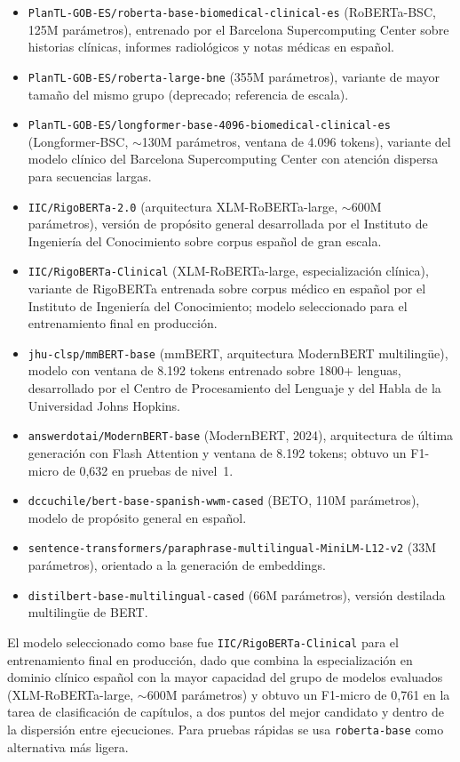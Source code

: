 \begin{itemize}
 \item \texttt{PlanTL-GOB-ES/roberta-base-biomedical-clinical-es} (RoBERTa-BSC, 125M parámetros), entrenado por el Barcelona Supercomputing Center sobre historias clínicas, informes radiológicos y notas médicas en español.
 \item \texttt{PlanTL-GOB-ES/roberta-large-bne} (355M parámetros), variante de mayor tamaño del mismo grupo (deprecado; referencia de escala).
 \item \texttt{PlanTL-GOB-ES/longformer-base-4096-biomedical-clinical-es} (Longformer-BSC, $\sim$130M parámetros, ventana de 4.096 tokens), variante del modelo clínico del Barcelona Supercomputing Center con atención dispersa para secuencias largas.
 \item \texttt{IIC/RigoBERTa-2.0} (arquitectura XLM-RoBERTa-large, $\sim$600M parámetros), versión de propósito general desarrollada por el Instituto de Ingeniería del Conocimiento sobre corpus español de gran escala.
 \item \texttt{IIC/RigoBERTa-Clinical} (XLM-RoBERTa-large, especialización clínica), variante de RigoBERTa entrenada sobre corpus médico en español por el Instituto de Ingeniería del Conocimiento; modelo seleccionado para el entrenamiento final en producción.
 \item \texttt{jhu-clsp/mmBERT-base} (mmBERT, arquitectura ModernBERT multilingüe), modelo con ventana de 8.192 tokens entrenado sobre 1800+ lenguas, desarrollado por el Centro de Procesamiento del Lenguaje y del Habla de la Universidad Johns Hopkins.
 \item \texttt{answerdotai/ModernBERT-base} (ModernBERT, 2024), arquitectura de última generación con Flash Attention y ventana de 8.192 tokens; obtuvo un F1-micro de 0{,}632 en pruebas de nivel~1.
 \item \texttt{dccuchile/bert-base-spanish-wwm-cased} (BETO, 110M parámetros), modelo de propósito general en español.
 \item \texttt{sentence-transformers/paraphrase-multilingual-MiniLM-L12-v2} (33M parámetros), orientado a la generación de embeddings.
 \item \texttt{distilbert-base-multilingual-cased} (66M parámetros), versión destilada multilingüe de BERT.
\end{itemize}

El modelo seleccionado como base fue \texttt{IIC/RigoBERTa-Clinical} para el entrenamiento final en producción, dado que combina la especialización en dominio clínico español con la mayor capacidad del grupo de modelos evaluados (XLM-RoBERTa-large, $\sim$600M parámetros) y obtuvo un F1-micro de 0{,}761 en la tarea de clasificación de capítulos, a dos puntos del mejor candidato y dentro de la dispersión entre ejecuciones. Para pruebas rápidas se usa \texttt{roberta-base} como alternativa más ligera.

